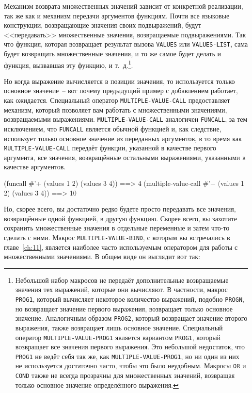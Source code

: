 Механизм возврата множественных значений зависит от конкретной реализации, так же как и
механизм передачи аргументов функциям.  Почти все языковые конструкции, возвращающие
значения своих подвыражений, будут <<передавать>> множественные значения, возвращаемые
подвыражениями.  Так что функция, которая возвращает результат вызова \lstinline{VALUES} или
\lstinline{VALUES-LIST}, сама будет возвращать множественные значения, и то же самое будет
делать и функция, вызвавшая эту функцию, и т.~д.\footnote{Небольшой набор макросов не
  передаёт дополнительные возвращаемые значения тех выражений, которые они вычисляют.  В
  частности, макрос \lstinline{PROG1}, который вычисляет некоторое количество выражений,
  подобно \lstinline{PROGN}, но возвращает значение первого выражения, возвращает только
  основное значение.  Аналогичным образом \lstinline{PROG2}, который возвращает значение
  второго выражения, также возвращает лишь основное значение.  Специальный оператор
  \lstinline{MULTIPLE-VALUE-PROG1} является вариантом \lstinline{PROG1}, который возвращает все
  значения первого выражения.  Это небольшой недостаток, что \lstinline{PROG1} не ведёт себя
  так же, как \lstinline{MULTIPLE-VALUE-PROG1}, но ни один из них не используется достаточно
  часто, чтобы это было неудобным.  Макросы \lstinline{OR} и \lstinline{COND} также не всегда
  прозрачны для множественных значений, возвращая только основное значение определённого
  выражения.}.

Но когда выражение вычисляется в позиции значения, то используется только основное
значение~-- вот почему предыдущий пример с добавлением работает, как ожидается. Специальный
оператор \lstinline{MULTIPLE-VALUE-CALL} предоставляет механизм, который позволяет вам работать
с множественными значениями, возвращаемыми выражениями. \lstinline{MULTIPLE-VALUE-CALL}
аналогичен \lstinline{FUNCALL}, за тем исключением, что \lstinline{FUNCALL} является обычной
функцией и, как следствие, использует только основное значение из переданных аргументов,
в то время как \lstinline{MULTIPLE-VALUE-CALL} передаёт функции, указанной в качестве первого
аргумента, все значения, возвращённые остальными выражениями, указанными в качестве
аргументов.

\begin{myverb}
  (funcall #'+ (values 1 2) (values 3 4))             ==> 4
  (multiple-value-call #'+ (values 1 2) (values 3 4)) ==> 10
\end{myverb}

Но, скорее всего, вы достаточно редко будете просто передавать все значения, возвращённые
одной функцией, в другую функцию.  Скорее всего, вы захотите сохранить множественные
значения в отдельные переменные и затем что-то сделать с ними.  Макрос
\lstinline{MULTIPLE-VALUE-BIND}, с которым вы встречались в главе~\ref{ch:11}, является
наиболее часто используемым оператором для работы с множественными значениями.  В общем
виде он выглядит вот так:

